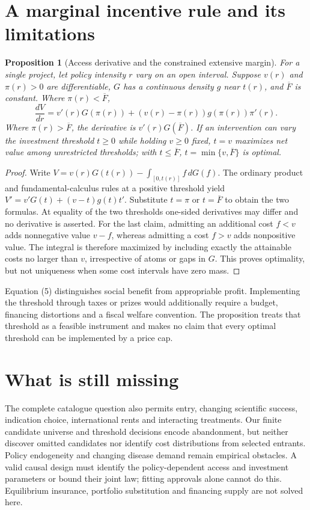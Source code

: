 \documentclass[11pt]{article}
\newtheorem{proposition}[theorem]{Proposition}
\begin{document}
\section{A marginal incentive rule and its limitations}
\begin{proposition}[Access derivative and the constrained extensive margin]
For a single project, let policy intensity $r$ vary on an open interval.
Suppose $v(r)$ and $\pi(r)>0$ are differentiable, $G$ has a continuous
density $g$ near $t(r)$, and $\overline F$ is constant. Where
$\pi(r)<\overline F$,
\[
 \frac{dV}{dr}=v'(r)G(\pi(r))
       +(v(r)-\pi(r))g(\pi(r))\pi'(r).                        \tag{5}
\]
Where $\pi(r)>\overline F$, the derivative is $v'(r)G(\overline F)$.
If an intervention can vary the investment threshold $t\geq0$ while holding
$v\geq0$ fixed, $t=v$ maximizes net value among unrestricted thresholds;
with $t\leq\overline F$, $t=\min\{v,\overline F\}$ is optimal.
\end{proposition}
\begin{proof}
Write $V=v(r)G(t(r))-\int_{[0,t(r)]}f\,dG(f)$.
The ordinary product and fundamental-calculus rules at a positive
threshold yield $V'=v'G(t)+(v-t)g(t)t'$. Substitute $t=\pi$ or
$t=\overline F$ to obtain the two formulas. At equality of the two
thresholds one-sided derivatives may differ and no derivative is asserted.
For the last claim, admitting an additional cost $f<v$ adds nonnegative
value $v-f$, whereas admitting a cost $f>v$ adds nonpositive value.
The integral is therefore maximized by including exactly the attainable
costs no larger than $v$, irrespective of atoms or gaps in $G$. This proves
optimality, but not uniqueness when some cost intervals have zero mass.
\end{proof}
Equation (5) distinguishes social benefit from appropriable profit.
Implementing the threshold through taxes or prizes would additionally
require a budget, financing distortions and a fiscal welfare convention.
The proposition treats that threshold as a feasible instrument and makes
no claim that every optimal threshold can be implemented by a price cap.

\section{What is still missing}
The complete catalogue question also permits entry, changing scientific
success, indication choice, international rents and interacting treatments.
Our finite candidate universe and threshold decisions encode abandonment,
but neither discover omitted candidates nor identify cost distributions
from selected entrants. Policy endogeneity and changing disease demand
remain empirical obstacles. A valid causal design must identify the
policy-dependent access and investment parameters or bound their joint
law; fitting approvals alone cannot do this. Equilibrium insurance,
portfolio substitution and financing supply are not solved here.
\end{document}

